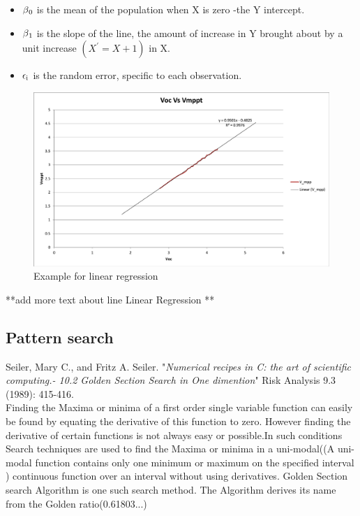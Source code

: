 {\begin{itemize}
\item $\beta\textsubscript{0}$ is the mean of the population when X is zero -the Y intercept.\\
\item $\beta\textsubscript{1}$ is the slope of the line, the amount of increase in Y brought about by a unit increase $(X^{'}= X + 1)$ in X.\\
\item \textbf{$\epsilon\textsubscript{i}$} is the random error, specific to each observation.
\end {itemize}
\begin{figure}[H]
  \begin{center}
  \includegraphics[width=\textwidth]{images/Reg_line}
  \caption{ Example for linear regression }
  \label{fig:linear_regression}
  \end{center}
  \end{figure}


**add more text about line Linear Regression **


\subsection{Pattern search}

Seiler, Mary C., and Fritz A. Seiler. "\textit{Numerical recipes in C: the art of scientific computing.- 10.2 Golden Section Search in One dimention}" Risk Analysis 9.3 (1989): 415-416.\\

Finding the Maxima or minima of a first order single variable function can easily be found by equating the derivative of this function to zero. However finding the derivative of certain functions is not always easy or possible.In such conditions Search techniques are used to find the Maxima or minima in a uni-modal((A uni-modal function contains only one minimum or maximum on the specified interval ) continuous function over an interval without using derivatives.  Golden Section search Algorithm is one such search method. The Algorithm derives its name from the Golden ratio(0.61803...)\\

}

